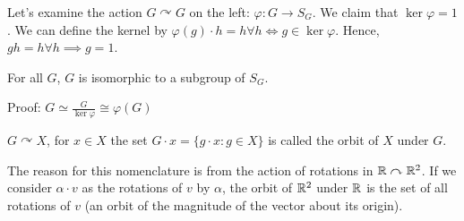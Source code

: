 \documentclass[a4paper,twoside,master.tex]{subfiles}
\begin{document}
Let's examine the action $ G\curvearrowright G $ on the left: $ \varphi \colon G \to S_G $. We claim that $ \ker \varphi = 1 $. We can define the kernel by $ \varphi(g) \cdot h = h \forall h \Leftrightarrow g \in \ker \varphi $. Hence, $ gh = h \forall h \implies g = 1 $.

\begin{theorem}[Cayley]
    For all $ G $, $ G $ is isomorphic to a subgroup of $ S_G $.

    Proof: $ G \simeq \frac{G}{\ker \varphi} \cong \varphi(G) $
    
\end{theorem}

\begin{definition}[Orbits]
    $ G\curvearrowright X $, for $ x \in X $ the set $ G \cdot x = \{g \cdot x\colon g \in X\} $ is called the orbit of $ X $ under $ G $.
\end{definition}

The reason for this nomenclature is from the action of rotations in $ \mathbb{R}\curvearrowright\mathbb{R}^2 $. If we consider $ \alpha \cdot v $ as the rotations of $ v $ by $ \alpha $, the orbit of $ \mathbb{R}^2 $ under $ \mathbb{R} $ is the set of all rotations of $ v $ (an orbit of the magnitude of the vector about its origin). 
\end{document}
